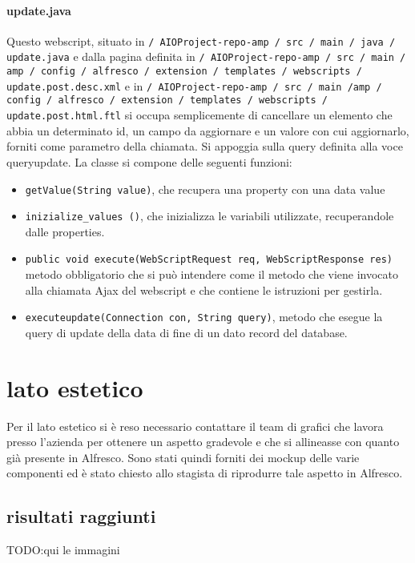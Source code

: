 \paragraph{update.java}
Questo webscript, situato in \texttt{/ AIOProject-repo-amp / src / main / java / update.java} e dalla pagina definita in \texttt{/ AIOProject-repo-amp / src / main / amp / config / alfresco / extension / templates / webscripts / update.post.desc.xml} e in \texttt{/ AIOProject-repo-amp / src / main /amp / config / alfresco / extension / templates / webscripts / update.post.html.ftl}  si occupa semplicemente di cancellare un elemento che abbia un determinato id, un campo da aggiornare e un valore con cui aggiornarlo,  forniti come parametro della chiamata. Si appoggia sulla query definita alla voce queryupdate.
La classe si compone delle seguenti funzioni:
\begin{itemize}
\item \texttt{getValue(String value)}, che recupera una property con una data value
\item \texttt{inizialize\_values ()}, che inizializza le variabili utilizzate, recuperandole dalle properties.
\item \texttt{public void execute(WebScriptRequest req, WebScriptResponse res)} metodo obbligatorio che si può intendere come il metodo che viene invocato alla chiamata Ajax del webscript e che contiene le istruzioni per gestirla.
\item \texttt{executeupdate(Connection con, String query)}, metodo che esegue la query di update della data di fine di un dato record del database.
\end{itemize}

\section{lato estetico}
Per il lato estetico si è reso necessario contattare il team di grafici che lavora presso l'azienda per ottenere un aspetto gradevole e che si allineasse con quanto già presente in Alfresco. Sono stati quindi forniti dei mockup delle varie componenti ed è stato chiesto allo stagista di riprodurre tale aspetto in Alfresco.
\subsection{risultati raggiunti}
TODO:qui le immagini